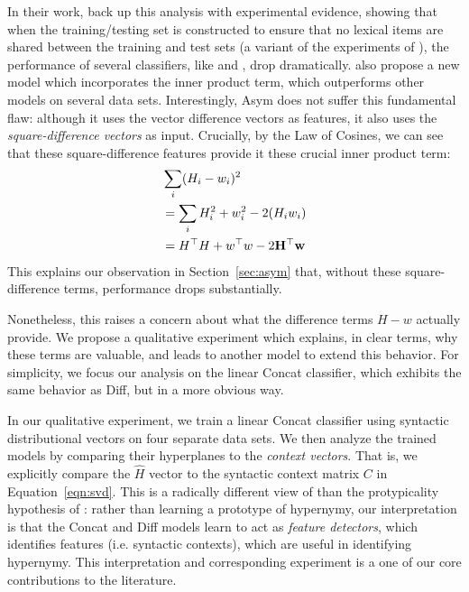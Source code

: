 \documentclass[12pt]{article}
\begin{document}
In their work,  back up this analysis with experimental
evidence, showing that when the training/testing set is constructed to
ensure that no lexical items are shared between the training and test sets
(a variant of the experiments of ), the performance
of several classifiers, like  and
, drop dramatically.  also
propose a new model which incorporates the inner product term, which
outperforms other models on several data sets.
Interestingly, Asym does not suffer this fundamental flaw: although it uses the
vector difference vectors as features, it also uses the {\em square-difference
vectors} as input. Crucially, by the Law of Cosines, we can see that these
square-difference features provide it these crucial inner product term:
\begin{align*}
  & \sum_i (H_i - w_i)^2\\
  & = \sum_i H_i^2 + w_i^2 - 2({H}_i{w}_i)\\
  & = H^\top H + w^\top w - 2{\bf H^\top{w}}
\end{align*}
This explains our observation in Section~\ref{sec:asym} that, without these
square-difference terms, performance drops substantially.

Nonetheless, this raises a concern about what the difference terms $H - w$
actually provide. We propose a qualitative experiment which explains, in
clear terms, why these terms are valuable, and leads to another model to
extend this behavior. For simplicity, we focus our analysis on the linear
Concat classifier, which exhibits the same behavior as Diff, but in a
more obvious way.

In our qualitative experiment, we train a linear Concat classifier using
syntactic distributional vectors on four separate data sets. We then analyze
the trained models by comparing their hyperplanes to the {\em context vectors}.
That is, we explicitly compare the $\hat H$ vector to the syntactic context
matrix $C$ in Equation~\ref{eqn:svd}. This is a radically
different view of than the protypicality hypothesis of
: rather than learning a prototype of hypernymy, our
interpretation is that the Concat and Diff models learn to act as {\em feature
detectors}, which identifies features (i.e. syntactic contexts), which are
useful in identifying hypernymy.  This interpretation and corresponding
experiment is a one of our core contributions to the literature.
\end{document}
